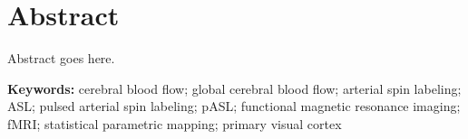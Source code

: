 \section{Abstract}
Abstract goes here.

\textbf{Keywords:} cerebral blood flow; global cerebral blood flow; arterial spin labeling; ASL; pulsed arterial spin labeling; pASL; functional magnetic resonance imaging; fMRI; statistical parametric mapping; primary visual cortex
